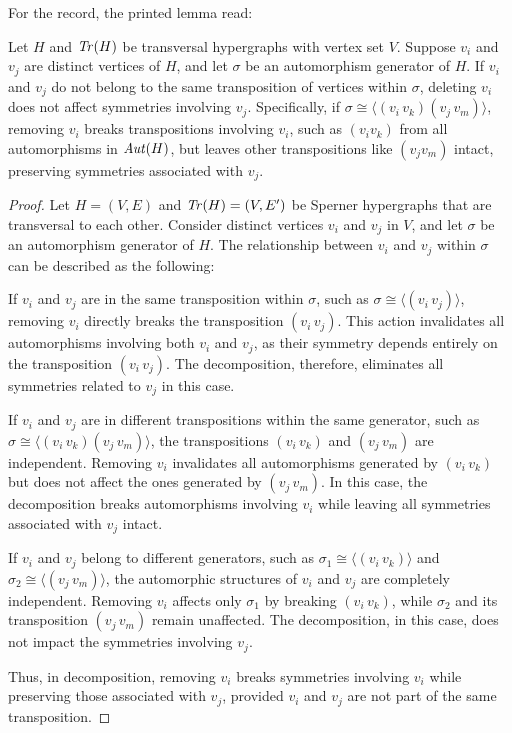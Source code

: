 For the record, the printed lemma read:

\begin{lemma}\label{lem:independent}
Let $H$ and $\mathit{Tr}(H)$ be transversal hypergraphs with vertex set $V$. Suppose $v_i$ and $v_j$ are distinct vertices of $H$, and let $\sigma$ be an automorphism generator of $H$. If $v_i$ and $v_j$ do not belong to the same transposition of vertices within $\sigma$, deleting $v_i$ does not affect symmetries involving $v_j$. Specifically, if $\sigma\cong\langle(v_i\,v_k)(v_j\,v_m)\rangle$, removing $v_i$ breaks transpositions involving $v_i$, such as $(v_iv_k)$ from all automorphisms in $\mathit{Aut}(H)$, but leaves other transpositions like $(v_jv_m)$ intact, preserving symmetries associated with $v_j$.
\end{lemma}

\begin{proof}
Let $H=(V,E)$ and $\mathit{Tr}(H)=(V,E')$ be Sperner hypergraphs that are transversal to each other. Consider distinct vertices $v_i$ and $v_j$ in $V$, and let $\sigma$ be an automorphism generator of $H$. The relationship between $v_i$ and $v_j$ within $\sigma$ can be described as the following:

If $v_i$ and $v_j$ are in the same transposition within $\sigma$, such as $\sigma\cong\langle(v_i\,v_j)\rangle$, removing $v_i$ directly breaks the transposition $(v_i\,v_j)$. This action invalidates all automorphisms involving both $v_i$ and $v_j$, as their symmetry depends entirely on the transposition $(v_i\,v_j)$. The decomposition, therefore, eliminates all symmetries related to $v_j$ in this case.

If $v_i$ and $v_j$ are in different transpositions within the same generator, such as $\sigma\cong\langle(v_i\,v_k)(v_j\,v_m)\rangle$, the transpositions $(v_i\,v_k)$ and $(v_j\,v_m)$ are independent. Removing $v_i$ invalidates all automorphisms generated by $(v_i\,v_k)$ but does not affect the ones generated by $(v_j\,v_m)$. In this case, the decomposition breaks automorphisms involving $v_i$ while leaving all symmetries associated with $v_j$ intact.

If $v_i$ and $v_j$ belong to different generators, such as $\sigma_1\cong\langle(v_i\,v_k)\rangle$ and $\sigma_2\cong\langle(v_j\,v_m)\rangle$, the automorphic structures of $v_i$ and $v_j$ are completely independent. Removing $v_i$ affects only $\sigma_1$ by breaking $(v_i\,v_k)$, while $\sigma_2$ and its transposition $(v_j\,v_m)$ remain unaffected. The decomposition, in this case, does not impact the symmetries involving $v_j$.

Thus, in \FKA{} decomposition, removing $v_i$ breaks symmetries involving $v_i$ while preserving those associated with $v_j$, provided $v_i$ and $v_j$ are not part of the same transposition.
\end{proof}

